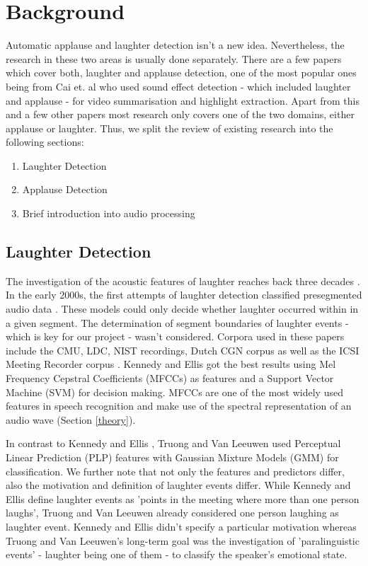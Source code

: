 \documentclass[bsc,frontabs,parskip,deptreport]{infthesis}
\begin{document}
\chapter{Background}
Automatic applause and laughter detection isn't a new idea. Nevertheless, the research in these two areas is usually done separately. There are a few papers which cover both, laughter and applause detection, one of the most popular ones being from Cai et. al \cite{cai2003highlight} who used sound effect detection - which included laughter and applause - for video summarisation and highlight extraction.
Apart from this and a few other papers most research only covers one of the two domains, either applause or laughter. Thus, we split the review of existing research into the following sections:
\begin{enumerate}
  \item Laughter Detection
  \item Applause Detection
  \item Brief introduction into audio processing
\end{enumerate}


\section{Laughter Detection}
The investigation of the acoustic features of laughter reaches back three decades \cite{bickley1992acoustic}.
In the early 2000s, the first attempts of laughter detection classified presegmented audio data \cite{kennedy2004laughter, truong2005automatic}. These models could only decide whether laughter occurred within in a given segment. The determination of segment boundaries of laughter events - which is key for our project - wasn't considered. 
Corpora used in these papers include the CMU, LDC, NIST recordings, Dutch CGN corpus as well as the ICSI Meeting Recorder corpus \cite{morgan2001meeting}. 
Kennedy and Ellis \cite{kennedy2004laughter} got the best results using Mel Frequency Cepstral Coefficients (MFCCs) as features and a Support Vector Machine (SVM) for decision making. 
MFCCs are one of the most widely used features in speech recognition and make use of the spectral representation of an audio wave (Section \ref{theory}).

In contrast to Kennedy and Ellis \cite{kennedy2004laughter}, Truong and Van Leeuwen \cite{truong2005automatic} used Perceptual Linear Prediction (PLP) features with Gaussian Mixture Models (GMM) for classification. 
We further note that not only the features and predictors differ, also the motivation and definition of laughter events differ. 
While Kennedy and Ellis define laughter events as 'points in the meeting where more than one person laughs', Truong and Van Leeuwen already considered one person laughing as laughter event.
Kennedy and Ellis didn't specify a particular motivation whereas Truong and Van Leeuwen's long-term goal was the investigation of 'paralinguistic events' - laughter being one of them - to classify the speaker's emotional state.   
\end{document}
